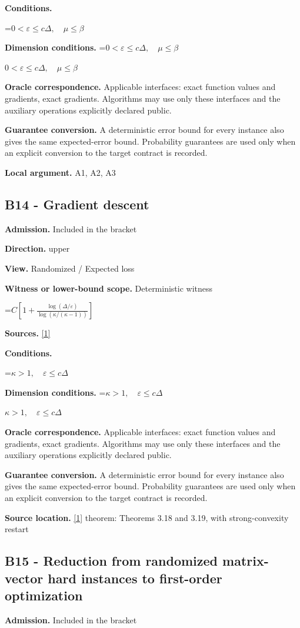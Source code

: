 \documentclass[10pt,a4paper]{article}
\newcommand{\AtlasMath}[1]{\par\begingroup\centering\setbox0=\hbox{$\displaystyle #1$}\ifdim\wd0>1.4\linewidth\typeout{ATLAS WIDE FORMULA: \the\wd0}\fi\ifdim\wd0>\linewidth\resizebox{\linewidth}{!}{\box0}\else\box0\fi\par\endgroup}
\newcommand{\AtlasInlineMath}[1]{\begingroup\setbox0=\hbox{$#1$}\ifdim\wd0>.4\linewidth\endgroup\AtlasMath{#1}\else\endgroup$#1$\fi}
\begin{document}
\textbf{Conditions.} 
\AtlasMath{0<\varepsilon\le c\Delta,\quad\mu\le\beta}


\textbf{Dimension conditions.} \AtlasInlineMath{0<\varepsilon\le c\Delta,\quad\mu\le\beta}

\textbf{Oracle correspondence.} Applicable interfaces: exact function values and gradients, exact gradients. Algorithms may use only these interfaces and the auxiliary operations explicitly declared public.

\textbf{Guarantee conversion.} A deterministic error bound for every instance also gives the same expected-error bound. Probability guarantees are used only when an explicit conversion to the target contract is recorded.

\textbf{Local argument.} A1, A2, A3

\subsection{B14 - Gradient descent}
\textbf{Admission.} Included in the bracket

\textbf{Direction.} upper

\textbf{View.} Randomized / Expected loss

\textbf{Witness or lower-bound scope.} Deterministic witness

\AtlasMath{C\left[1+\frac{\log(\Delta/\varepsilon)}{\log(\kappa/(\kappa-1))}\right]}
\textbf{Sources.} \href{https://arxiv.org/pdf/1405.4980}{[1]}

\textbf{Conditions.} 
\AtlasMath{\kappa>1,\quad\varepsilon\le c\Delta}


\textbf{Dimension conditions.} \AtlasInlineMath{\kappa>1,\quad\varepsilon\le c\Delta}

\textbf{Oracle correspondence.} Applicable interfaces: exact function values and gradients, exact gradients. Algorithms may use only these interfaces and the auxiliary operations explicitly declared public.

\textbf{Guarantee conversion.} A deterministic error bound for every instance also gives the same expected-error bound. Probability guarantees are used only when an explicit conversion to the target contract is recorded.

\textbf{Source location.} \href{https://arxiv.org/pdf/1405.4980}{[1]} theorem: Theorems 3.18 and 3.19, with strong-convexity restart

\subsection{B15 - Reduction from randomized matrix-vector hard instances to first-order optimization}
\textbf{Admission.} Included in the bracket
\end{document}
